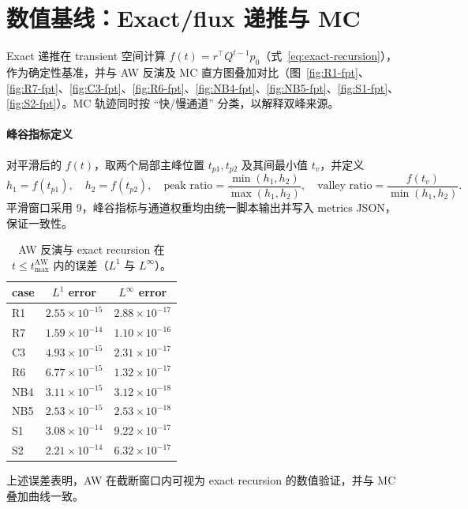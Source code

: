 \documentclass[11pt,fontset=fandol]{ctexart}
\begin{document}
\section{数值基线：Exact/flux 递推与 MC}
Exact 递推在 transient 空间计算 $f(t)=r^\top Q^{t-1} p_0$（式~\ref{eq:exact-recursion}），作为确定性基准，并与 AW 反演及 MC 直方图叠加对比（图~\ref{fig:R1-fpt}、\ref{fig:R7-fpt}、\ref{fig:C3-fpt}、\ref{fig:R6-fpt}、\ref{fig:NB4-fpt}、\ref{fig:NB5-fpt}、\ref{fig:S1-fpt}、\ref{fig:S2-fpt}）。MC 轨迹同时按 ``快/慢通道'' 分类，以解释双峰来源。

\paragraph{峰谷指标定义}
对平滑后的 $f(t)$，取两个局部主峰位置 $t_{p1},t_{p2}$ 及其间最小值 $t_v$，并定义
\begin{equation}
  h_1=f(t_{p1}),\quad h_2=f(t_{p2}),\quad
  \text{peak ratio}=\frac{\min(h_1,h_2)}{\max(h_1,h_2)},\quad
  \text{valley ratio}=\frac{f(t_v)}{\min(h_1,h_2)}.
\end{equation}
平滑窗口采用 9，峰谷指标与通道权重均由统一脚本输出并写入 metrics JSON，保证一致性。

\begin{table}[!htbp]
  \centering
  \begin{tabular}{lcc}
    \toprule
    case & $L^1$ error & $L^\infty$ error \\
    \midrule
    R1 & $2.55\times 10^{-15}$ & $2.88\times 10^{-17}$ \\
    R7 & $1.59\times 10^{-14}$ & $1.10\times 10^{-16}$ \\
    C3 & $4.93\times 10^{-15}$ & $2.31\times 10^{-17}$ \\
    R6 & $6.77\times 10^{-15}$ & $1.32\times 10^{-17}$ \\
    NB4 & $3.11\times 10^{-15}$ & $3.12\times 10^{-18}$ \\
    NB5 & $2.53\times 10^{-15}$ & $2.53\times 10^{-18}$ \\
    S1 & $3.08\times 10^{-14}$ & $9.22\times 10^{-17}$ \\
    S2 & $2.21\times 10^{-14}$ & $6.32\times 10^{-17}$ \\
    \bottomrule
  \end{tabular}
  \caption{AW 反演与 exact recursion 在 $t\le t_{\max}^{\mathrm{AW}}$ 内的误差（$L^1$ 与 $L^\infty$）。}
  \label{tab:aw-errors}
\end{table}
\noindent 上述误差表明，AW 在截断窗口内可视为 exact recursion 的数值验证，并与 MC 叠加曲线一致。
\end{document}
